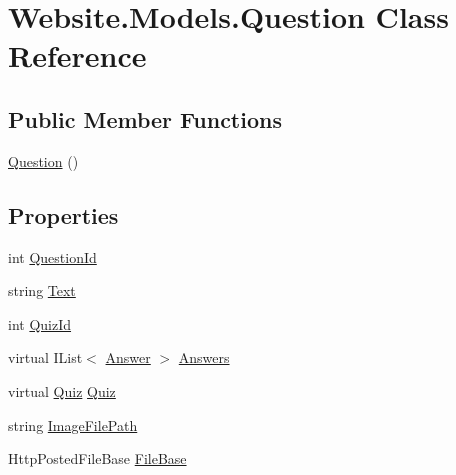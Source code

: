 \hypertarget{class_website_1_1_models_1_1_question}{}\section{Website.\+Models.\+Question Class Reference}
\label{class_website_1_1_models_1_1_question}
\subsection*{Public Member Functions}
\begin{DoxyCompactItemize}
\item 
\hyperlink{class_website_1_1_models_1_1_question_a02f3d2ebf55fd1c32bc13d39d394dbfc}{Question} ()
\end{DoxyCompactItemize}
\subsection*{Properties}
\begin{DoxyCompactItemize}
\item 
int \hyperlink{class_website_1_1_models_1_1_question_ae38fdbaceb7dbdf048af25503637efe2}{Question\+Id}
\item 
string \hyperlink{class_website_1_1_models_1_1_question_a503746cf0052ab25134a770284ea2691}{Text}
\item 
int \hyperlink{class_website_1_1_models_1_1_question_a54622ce995fec691fc935f77bd95a7a3}{Quiz\+Id}
\item 
virtual I\+List$<$ \hyperlink{class_website_1_1_models_1_1_answer}{Answer} $>$ \hyperlink{class_website_1_1_models_1_1_question_a279ad042082888db59eaff0351391cee}{Answers}
\item 
virtual \hyperlink{class_website_1_1_models_1_1_quiz}{Quiz} \hyperlink{class_website_1_1_models_1_1_question_a08bdca8c44c01af0f79f80a7f41ad459}{Quiz}
\item 
string \hyperlink{class_website_1_1_models_1_1_question_ae118b3710c213f806b9e2618136a9de1}{Image\+File\+Path}
\item 
Http\+Posted\+File\+Base \hyperlink{class_website_1_1_models_1_1_question_a40001ac043de6efc0f89ecb9422980b5}{File\+Base}
\end{DoxyCompactItemize}


